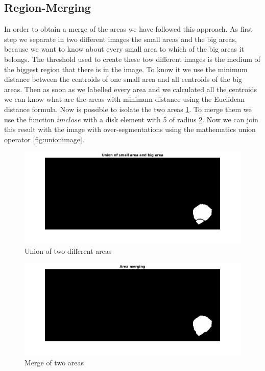 \subsection{Region-Merging}
In order to obtain a merge of the areas we have followed this approach. As first step we separate in two different images the small areas and the big areas, because we want to know about every small area to which of the big areas it belongs. The threshold used to create these tow different images is the medium of the biggest region that there is in the image. To know it we use the minimum distance between the centroids of one small area and all centroids of  the big areas. Then as soon as we labelled every area and we calculated all the centroids we can know what are the areas with minimum distance using the Euclidean distance formula. Now is possible to isolate the two areas \ref{fig:areas}. To merge them we use the function $imclose$ with a disk element with 5 of radius \ref{fig:mergeareas}. Now we can join this result with the image with over-segmentations using the mathematics union operator \ref{fig:unionimage}.
\begin{figure}
	\begin{center}
		\centering
		\includegraphics[scale=0.5]{img/final/unionareas.png}
		\caption{Union of two different areas}
		\label{fig:areas}
	\end{center}
\end{figure}
\begin{figure}
	\begin{center}
		\centering
		\includegraphics[scale=0.5]{img/final/areamerging.png}
		\caption{Merge of two areas}
		\label{fig:mergeareas}
	\end{center}
\end{figure}
